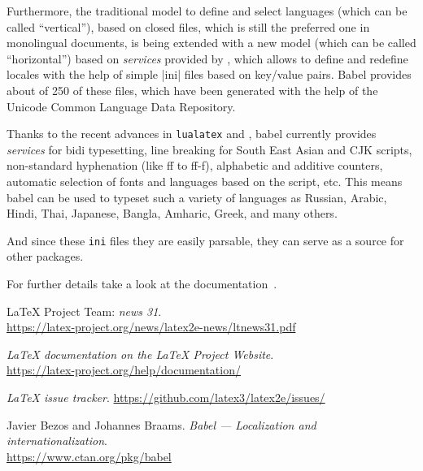 \documentclass{ltnews}
\begin{document}
Furthermore, the traditional model to define and select languages
(which can be called \enquote{vertical}), based on closed files, which
is still the preferred one in monolingual documents, is being extended
with a new model (which can be called \enquote{horizontal}) based on
\emph{services} provided by , which allows to define and
redefine locales with the help of simple |ini| files based on
key/value pairs.  Babel provides about of 250 of these files, which
have been generated with the help of the Unicode Common Language Data
Repository.

Thanks to the recent advances in \texttt{lualatex} and
, babel currently provides \emph{services} for bidi
typesetting, line breaking for South East Asian and CJK scripts,
non-standard hyphenation (like ff to ff-f), alphabetic and additive
counters, automatic selection of fonts and languages based on the
script, etc. This means babel can be used to typeset such a variety of
languages as Russian, Arabic, Hindi, Thai, Japanese, Bangla, Amharic,
Greek, and many others.

And since these \texttt{ini} files they are easily parsable, they can
serve as a source for other packages.

For further details take a look at the 
documentation~\cite{32:babel}.


\begin{thebibliography}{9}

\fontsize{9.3}{11.3}\selectfont

 \LaTeX{} Project Team:
  \emph{\LaTeXe{} news 31}.\\
  \url{https://latex-project.org/news/latex2e-news/ltnews31.pdf}

  \emph{\LaTeX{} documentation on the \LaTeX{} Project Website}.\\
  \url{https://latex-project.org/help/documentation/}

  \emph{\LaTeX{} issue tracker}.
  \url{https://github.com/latex3/latex2e/issues/}

  Javier Bezos and Johannes Braams.
  \emph{Babel --- Localization and internationalization}.\\
  \url{https://www.ctan.org/pkg/babel}

\end{thebibliography}
\end{document}
